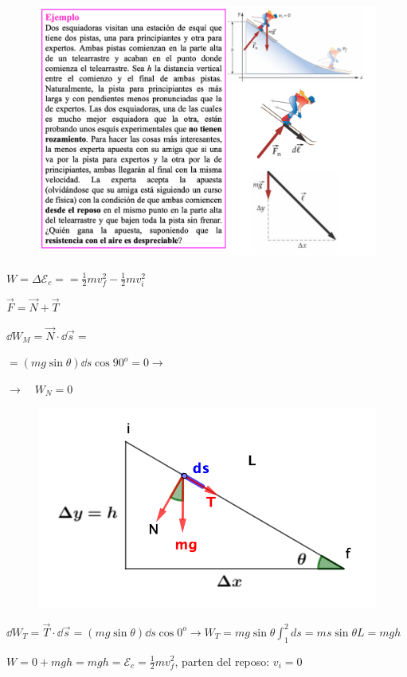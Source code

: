 \begin{figure}[H]
		\centering
		\includegraphics[width=1\textwidth]{imagenes/imagenes03/T03IM05.png}
		\end{figure}


\begin{multicols}{2}
	$W=\Delta \mathcal E_c==\frac 1 2 m v_f^2-\frac 1 2 m v_i^2$
	
	$\vec F=\vec N+\vec T$
	
	$\dd W _M=\vec N \cdot \dd \vec s=$
	
	$=(mg\sin \theta) \dd s \cos 90^o=0\to $ 
	
	$\to \quad W_N=0$
	\begin{figure}[H]
		\centering
		\includegraphics[width=.55\textwidth]{imagenes/imagenes03/T03IM47.png}
		\end{figure}
\end{multicols}
\vspace{-5mm}$\dd W_T= \vec T \cdot \dd \vec s=(mg \sin \theta) \dd s \cos 0^o \to W_T=mg\sin \theta \int_1^2 ds
=ms \sin \theta L=mgh$

$W=0+mgh=mgh=\mathcal E_c=\frac 1 2 m v_f^2$, parten del reposo: $v_i=0$

